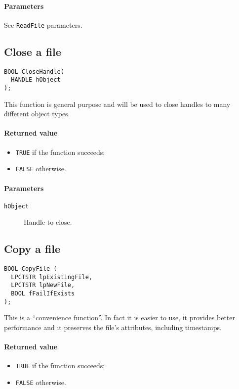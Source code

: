 \paragraph{Parameters}
See \texttt{ReadFile} parameters.

\subsection{Close a file}
\begin{verbatim}
BOOL CloseHandle(
  HANDLE hObject
);
\end{verbatim}

This function is general purpose and will be used to close handles to many different object types.

\paragraph{Returned value}
\begin{itemize}
\item \texttt{TRUE} if the function succeeds;
\item \texttt{FALSE} otherwise.
\end{itemize}

\paragraph{Parameters}
\begin{description}
\item [\texttt{hObject}] Handle to close.
\end{description}

\subsection*{Copy a file}
\begin{verbatim}
BOOL CopyFile (
  LPCTSTR lpExistingFile,
  LPCTSTR lpNewFile,
  BOOL fFailIfExists
);
\end{verbatim}

This is a ``convenience function''. In fact it is easier to use, it provides better performance and it preserves the file's attributes, including timestamps.

\paragraph{Returned value}
\begin{itemize}
\item \texttt{TRUE} if the function succeeds;
\item \texttt{FALSE} otherwise.
\end{itemize}

